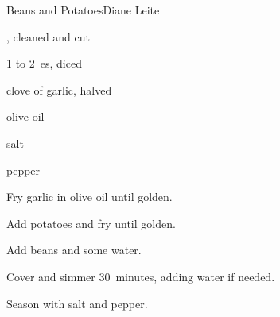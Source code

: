 \begin{recipe}{Beans and Potatoes}{Diane Leite}{}

\begin{ingredients}
\item {}, cleaned and cut
\item 1 to 2~es, diced
\item clove of garlic, halved
\item olive oil
\item salt
\item pepper
\end{ingredients}

\begin{directions}
\item Fry garlic in olive oil until golden.
\item Add potatoes and fry until golden.
\item Add beans and some water.
\item Cover and simmer 30~minutes, adding water if needed.
\item Season with salt and pepper.
\end{directions}

\end{recipe}
